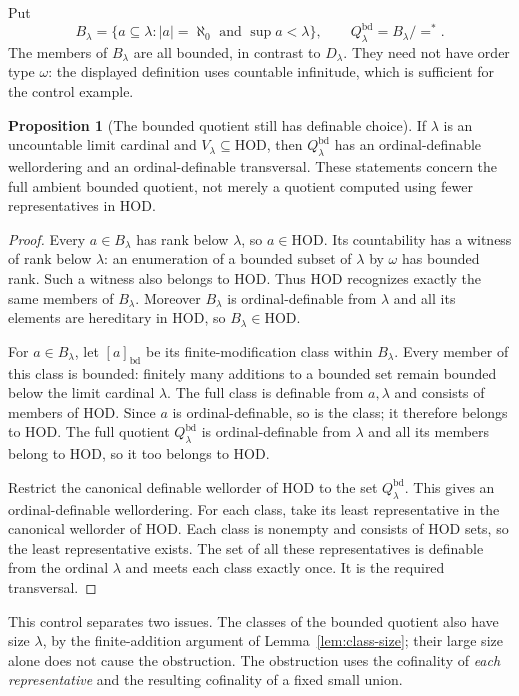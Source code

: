 \documentclass[11pt,letterpaper]{article}
\theoremstyle{definition}
\newtheorem{proposition}[definition]{Proposition}
\newcommand{\HOD}{\mathrm{HOD}}
\numberwithin{equation}{section}
\newcommand{\eqfin}{\mathrel{=^{*}}}
\begin{document}
Put
\[
 B_\lambda=\{a\subseteq\lambda: |a|=\aleph_0\text{ and }\sup a<\lambda\},
 \qquad Q^{\mathrm{bd}}_\lambda=B_\lambda/{\eqfin}.
\]
The members of $B_\lambda$ are all bounded, in contrast to $D_\lambda$.
They need not have order type $\omega$: the displayed definition uses
countable infinitude, which is sufficient for the control example.

\begin{proposition}[The bounded quotient still has definable choice]\label{prop:bounded-positive}
If $\lambda$ is an uncountable limit cardinal and $V_\lambda\subseteq\HOD$,
then $Q^{\mathrm{bd}}_\lambda$ has an ordinal-definable wellordering and an
ordinal-definable transversal. These statements concern the full ambient
bounded quotient, not merely a quotient computed using fewer representatives
in $\HOD$.
\end{proposition}

\begin{proof}
Every $a\in B_\lambda$ has rank below $\lambda$, so $a\in\HOD$. Its
countability has a witness of rank below $\lambda$: an enumeration of a
bounded subset of $\lambda$ by $\omega$ has bounded rank. Such a witness
also belongs to $\HOD$. Thus $\HOD$ recognizes exactly the same members of
$B_\lambda$. Moreover $B_\lambda$ is ordinal-definable from $\lambda$ and
all its elements are hereditary in $\HOD$, so $B_\lambda\in\HOD$.

For $a\in B_\lambda$, let $[a]_{\mathrm{bd}}$ be its finite-modification
class within $B_\lambda$. Every member of this class is bounded: finitely
many additions to a bounded set remain bounded below the limit cardinal
$\lambda$. The full class is definable from $a,\lambda$ and consists of
members of $\HOD$. Since $a$ is ordinal-definable, so is the class; it
therefore belongs to $\HOD$. The full quotient $Q^{\mathrm{bd}}_\lambda$
is ordinal-definable from $\lambda$ and all its members belong to $\HOD$,
so it too belongs to $\HOD$.

Restrict the canonical definable wellorder of $\HOD$ to the set
$Q^{\mathrm{bd}}_\lambda$. This gives an ordinal-definable wellordering.
For each class, take its least representative in the canonical wellorder
of $\HOD$. Each class is nonempty and consists of $\HOD$ sets, so the least
representative exists. The set of all these representatives is definable
from the ordinal $\lambda$ and meets each class exactly once. It is the
required transversal.
\end{proof}

This control separates two issues. The classes of the bounded quotient also
have size $\lambda$, by the finite-addition argument of
Lemma~\ref{lem:class-size}; their large size alone does not cause the
obstruction. The obstruction uses the cofinality of \emph{each representative}
and the resulting cofinality of a fixed small union.
\end{document}
